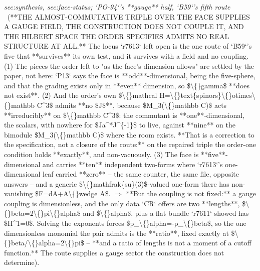 \begin{description}
\textit{sec:synthesis, sec:face-status; `PO-94`'s **gauge** half, `B59`'s fifth route} \ (**THE ALMOST-COMMUTATIVE TRIPLE OVER THE FACE SUPPLIES A GAUGE FIELD, THE CONSTRUCTION DOES NOT COUPLE IT, AND THE HILBERT SPACE THE ORDER SPECIFIES ADMITS NO REAL STRUCTURE AT ALL.** The locus `r7613` left open is the one route of `B59`'s five that **survives** its own test, and it survives with a field and no coupling. (1) The pieces the order left to "as the face's dimension allows" are settled by the paper, not here: `P13` says the face is **odd**-dimensional, being the five-sphere, and that the grading exists only in **even** dimension, so \$\textbackslash\{\}gamma\$ **does not exist**. (2) And the order's own \$\textbackslash\{\}mathcal H=\textbackslash\{\}text\{spinors\}\textbackslash\{\}otimes\textbackslash\{\}mathbb C\textasciicircum{}3\$ admits **no \$J\$**, because \$M\_3(\textbackslash\{\}mathbb C)\$ acts **irreducibly** on \$\textbackslash\{\}mathbb C\textasciicircum{}3\$: the commutant is **one**-dimensional, the scalars, with nowhere for \$Ja\textasciicircum{}*J\textasciicircum{}\{-1\}\$ to live, against **nine** on the bimodule \$M\_3(\textbackslash\{\}mathbb C)\$ where the room exists.  **That is a correction to the specification, not a closure of the route:** on the repaired triple the order-one condition holds **exactly**, and non-vacuously. (3) The face is **five**-dimensional and carries **ten** independent two-forms where `r7613`'s one-dimensional leaf carried **zero** -- the same counter, the same file, opposite answers -- and a generic \$\textbackslash\{\}mathfrak\{su\}(3)\$-valued one-form there has non-vanishing \$F=dA+A\textbackslash\{\}wedge A\$. \ensuremath{\Rightarrow} **But the coupling is not fixed:** a gauge coupling is dimensionless, and the only data `CR` offers are two **lengths**, \$\textbackslash\{\}beta=2\textbackslash\{\}pi\textbackslash\{\}alpha\$ and \$\textbackslash\{\}alpha\$, plus a flat bundle `r7611` showed has \$H\textasciicircum{}1=0\$. Solving the exponents forces \$p\_\textbackslash\{\}alpha=-p\_\textbackslash\{\}beta\$, so the one dimensionless monomial the pair admits is the **ratio**, fixed exactly at \$\textbackslash\{\}beta/\textbackslash\{\}alpha=2\textbackslash\{\}pi\$ -- **and a ratio of lengths is not a moment of a cutoff function.** The route supplies a gauge sector the construction does not determine). 

\end{description}
